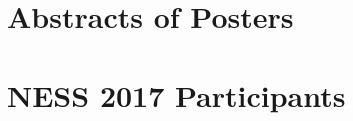 \documentclass[11pt]{article}
\begin{document}
\newpage

\section*{\centering Abstracts of Posters}


\newpage

\section*{\centering NESS 2017 Participants}
\begin{multicols}{4}
\scriptsize

\end{multicols}
\end{document}
